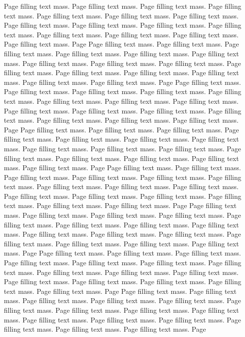 \documentclass[12pt,a4paper,twoside,openright]{book}
\begin{document}
Page filling text mass. Page filling text mass. Page filling text mass. Page
filling text mass. Page filling text mass. Page filling text mass. Page
filling text mass. Page filling text mass. Page filling text mass. Page
filling text mass. Page filling text mass. Page filling text mass. Page
filling text mass. Page filling text mass. Page filling text mass. Page
Page filling text mass. Page filling text mass. Page filling text mass. Page
filling text mass. Page filling text mass. Page filling text mass. Page
filling text mass. Page filling text mass. Page filling text mass. Page
filling text mass. Page filling text mass. Page filling text mass. Page
filling text mass. Page filling text mass. Page filling text mass. Page
Page filling text mass. Page filling text mass. Page filling text mass. Page
filling text mass. Page filling text mass. Page filling text mass. Page
filling text mass. Page filling text mass. Page filling text mass. Page
filling text mass. Page filling text mass. Page filling text mass. Page
filling text mass. Page filling text mass. Page filling text mass. Page
Page filling text mass. Page filling text mass. Page filling text mass. Page
filling text mass. Page filling text mass. Page filling text mass. Page
filling text mass. Page filling text mass. Page filling text mass. Page
filling text mass. Page filling text mass. Page filling text mass. Page
filling text mass. Page filling text mass. Page filling text mass. Page
Page filling text mass. Page filling text mass. Page filling text mass. Page
filling text mass. Page filling text mass. Page filling text mass. Page
filling text mass. Page filling text mass. Page filling text mass. Page
filling text mass. Page filling text mass. Page filling text mass. Page
filling text mass. Page filling text mass. Page filling text mass. Page
Page filling text mass. Page filling text mass. Page filling text mass. Page
filling text mass. Page filling text mass. Page filling text mass. Page
filling text mass. Page filling text mass. Page filling text mass. Page
filling text mass. Page filling text mass. Page filling text mass. Page
filling text mass. Page filling text mass. Page filling text mass. Page
Page filling text mass. Page filling text mass. Page filling text mass. Page
filling text mass. Page filling text mass. Page filling text mass. Page
filling text mass. Page filling text mass. Page filling text mass. Page
filling text mass. Page filling text mass. Page filling text mass. Page
filling text mass. Page filling text mass. Page filling text mass. Page
Page filling text mass. Page filling text mass. Page filling text mass. Page
filling text mass. Page filling text mass. Page filling text mass. Page
filling text mass. Page filling text mass. Page filling text mass. Page
filling text mass. Page filling text mass. Page filling text mass. Page
filling text mass. Page filling text mass. Page filling text mass. Page
\end{document}
